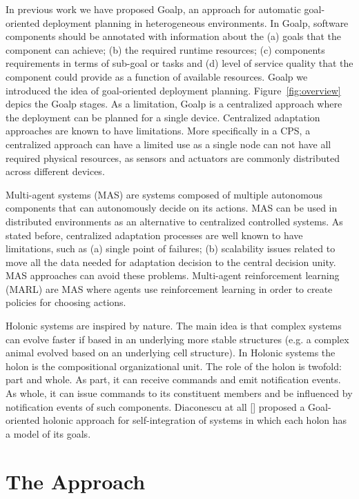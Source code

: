 \documentclass[conference]{IEEEtran}
\begin{document}
In previous work we have proposed Goalp, an approach for automatic goal-oriented deployment planning in heterogeneous environments. In Goalp, software components should be annotated with information about the (a) goals that the component can achieve; (b) the required runtime resources; (c) components requirements in terms of sub-goal or tasks and (d) level of service quality that the component could provide as a function of available resources.  
Goalp we introduced the idea of goal-oriented deployment planning. 
Figure~\ref{fig:overview} depics the Goalp stages.
 As a limitation, Goalp is a centralized approach where the deployment can be planned for a single device. Centralized adaptation approaches are known to have limitations. More specifically in a CPS, a centralized approach can have a limited use as a single node can not have all required physical resources, as sensors and actuators are commonly distributed across different devices. 

Multi-agent systems (MAS) are systems composed of multiple autonomous components that can autonomously decide on its actions. MAS can be used in distributed environments as an alternative to centralized controlled systems.
As stated before, centralized adaptation processes are well known to have limitations, such as (a) single point of failures;  (b) scalability issues related to move all the data needed for adaptation decision to the central decision unity. MAS approaches can avoid these problems. Multi-agent reinforcement learning (MARL) are MAS where agents use reinforcement learning in order to create policies for choosing actions.

Holonic systems are inspired by nature. The main idea is that complex systems can evolve faster if based in an underlying more stable structures (e.g. a complex animal evolved based on an underlying cell structure). In Holonic systems the holon is the compositional organizational unit. The role of the holon is twofold: part and whole. As part, it can receive commands and emit notification events. As whole, it can issue commands to its constituent members and be influenced by notification events of such components. Diaconescu at all [] proposed a Goal-oriented holonic approach for self-integration of systems in which each holon has a model of its goals.


\section{The Approach}
\end{document}
